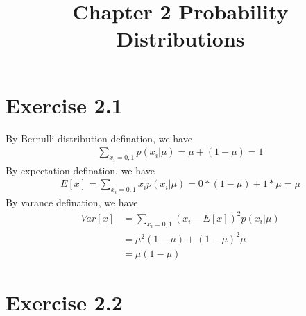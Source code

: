 \documentclass{article}
\title{Chapter 2 Probability Distributions}
\author{}
\date{}
\begin{document}
\maketitle
\section*{Exercise 2.1}
By Bernulli distribution defination, we have
\begin{align}
    \sum_{x_i=0, 1} p(x_i|\mu) = \mu + (1 - \mu) = 1
\end{align}
By expectation defination, we have
\begin{align}
    E[x] = \sum_{x_i=0, 1} x_ip(x_i|\mu) = 0 * (1 - \mu) + 1 * \mu=\mu
\end{align}
By varance defination, we have
\begin{align}
    Var[x] & = \sum_{x_i=0, 1} (x_i - E[x])^2p(x_i|\mu) \\
    & = \mu^2 (1 - \mu) + (1 - \mu)^2 \mu \\
    & = \mu (1 - \mu)
\end{align}
\section*{Exercise 2.2}
\end{document}
